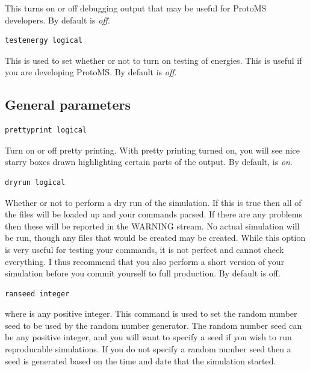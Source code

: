 \documentclass[letterpaper,10pt,english]{sphinxmanual}
\begin{document}
This turns on or off debugging output that may be useful for ProtoMS developers. By default  is \emph{off}.

\begin{Verbatim}[commandchars=\\\{\}]
testenergy logical
\end{Verbatim}

This is used to set whether or not to turn on testing of energies. This is useful if you are developing ProtoMS. By default  is \emph{off}.


\subsection{General parameters}
\label{protoms:general-parameters}
\begin{Verbatim}[commandchars=\\\{\}]
prettyprint logical
\end{Verbatim}

Turn on or off pretty printing. With pretty printing turned on, you will see nice starry boxes drawn highlighting certain parts of the output. By default,  is \emph{on}.

\begin{Verbatim}[commandchars=\\\{\}]
dryrun logical
\end{Verbatim}

Whether or not to perform a dry run of the simulation. If this is true then all of the files will be loaded up and your commands parsed. If there are any problems then these will be reported in the WARNING stream. No actual simulation will be run, though any files that would be created may be created. While this option is very useful for testing your commands, it is not perfect and cannot check everything. I thus recommend that you also perform a short version of your simulation before you commit yourself to full production. By default  is off.

\begin{Verbatim}[commandchars=\\\{\}]
ranseed integer
\end{Verbatim}

where  is any positive integer. This command is used to set the random number seed to be used by the random number generator. The random number seed can be any positive integer, and you will want to specify a seed if you wish to run reproducable simulations. If you do not specify a random number seed then a seed is generated based on the time and date that the simulation started.
\end{document}
